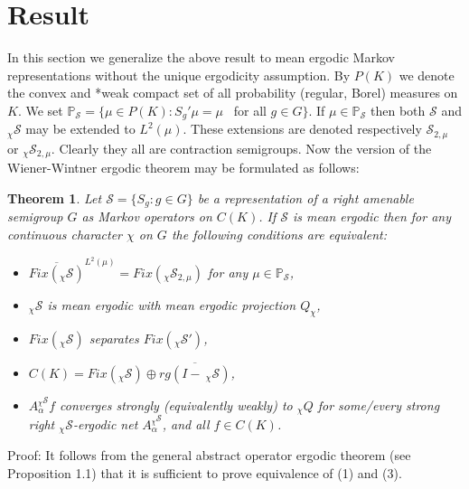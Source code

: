 \documentclass{amsart}
\newtheorem{thm}{Theorem}[section]
\theoremstyle{definition}
\theoremstyle{remark}
\numberwithin{equation}{section}
\begin{document}
\section{Result}

In this section we generalize the above result to mean ergodic Markov representations
without the unique ergodicity assumption. By $P(K)$ we denote  the
convex and *weak compact set of all probability (regular, Borel) measures on $K$.
We set $\mathbb{P}_{\mathcal{S}} = \{ \mu\in P(K) : S_g'\mu = \mu $ \ for all $g\in G \}$.
If $\mu \in \mathbb{P}_{\mathcal{S}} $ then  both $\mathcal{S}$ and $_{\chi}\mathcal{S}$
may be extended to $L^2(\mu )$. These extensions are
denoted respectively $\mathcal{S}_{2, \mu}$  or $_{\chi}\mathcal{S}_{2,\mu}$. Clearly
they all are contraction semigroups.   Now the version
of the Wiener-Wintner ergodic theorem may be formulated as follows:

\begin{thm}
Let $\mathcal{S} = \{ S_g : g\in G \}$ be a
representation of a right amenable semigroup $G$ as Markov operators on
$C(K)$. If $\mathcal{S}$ is mean ergodic then for any continuous character $\chi $ on $G$
the following conditions are equivalent:
\begin{itemize}
\item[(1)] $\overline{Fix(_{\chi}\mathcal{S})}^{L^2(\mu)} = Fix(_{\chi}\mathcal{S}_{2,\mu})$ for any
$\mu \in \mathbb{P}_{\mathcal{S}}$,
\item[(2)] $_{\chi}\mathcal{S}$ is mean ergodic with mean ergodic projection $Q_{\chi}$,
\item[(3)] $Fix(\mathcal{_{\chi}S})$ separates $Fix(_{\chi}\mathcal{S}')$,
\item[(4)] $C(K) = Fix(_{\chi}\mathcal{S})\oplus \overline{rg(I - \ _{\chi}\mathcal{S})} $,
\item[(5)] $A_{\alpha}^{_{\chi}\mathcal{S}}f$ converges strongly (equivalently weakly) to $_{\chi}Q$
for some/every strong right $_{\chi}\mathcal{S}$-ergodic net $A_{\alpha}^{_{\chi}\mathcal{S}}$,
and all $f\in C(K)$.
\end{itemize}
\end{thm}
Proof: It follows from the general abstract operator ergodic theorem (see Proposition 1.1)
that it is sufficient to prove equivalence of (1) and (3).
\end{document}

